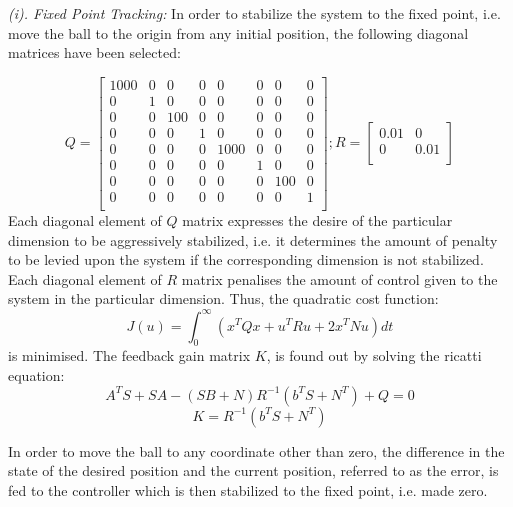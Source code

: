 \documentclass[conference]{IEEEtran}
\begin{document}
\emph{(i). Fixed Point Tracking:} In order to stabilize the system to the fixed point, i.e. move the ball to the origin from any initial position, the following diagonal matrices have been selected:

\footnotesize
\begin{equation}
Q = \begin{bmatrix}
1000 & 0 & 0 & 0 & 0 & 0 & 0 & 0 \\
0 & 1 & 0 & 0 & 0 & 0 & 0 & 0 \\
0 & 0 & 100 & 0 & 0 & 0 & 0 & 0 \\
0 & 0 & 0 & 1 & 0 & 0 & 0 & 0 \\
0 & 0 & 0 & 0 & 1000 & 0 & 0 & 0 \\
0 & 0 & 0 & 0 & 0 & 1 & 0 & 0 \\
0 & 0 & 0 & 0 & 0 & 0 & 100 & 0 \\
0 & 0 & 0 & 0 & 0 & 0 & 0 & 1 \\
\end{bmatrix} ; 
R = \begin{bmatrix}
0 .01& 0 \\
0 & 0.01 \\
\end{bmatrix}\label{eq23}
\end{equation}
\normalsize
Each diagonal element of $Q$ matrix expresses the desire of the particular dimension to be aggressively stabilized, i.e. it determines the amount of penalty to be levied upon the system if the corresponding dimension is not stabilized. Each diagonal element of $R$ matrix penalises the amount of control given to the system in the particular dimension. Thus, the quadratic cost function: 
\begin{equation}
J(u) = \int_{0}^{\infty} (x^T Q x + u^T R u + 2 x^T N u ) dt
\label{eqn24}\end{equation}
 is minimised. 
The feedback gain matrix $K$, is found out by solving the ricatti equation: 
\begin{equation}
A^T S + SA - (SB +N) R^{-1} (b^T S + N^T) + Q = 0
\label{eqn25}\end{equation}
\begin{equation}
K = R^{-1} (b^T S + N^T)
\label{eqn26}\end{equation}

In order to move the ball to any coordinate other than zero, the difference in the state of the desired position and the current position, referred to as the error, is fed to the controller which is then stabilized to the fixed point, i.e. made zero.
\end{document}
